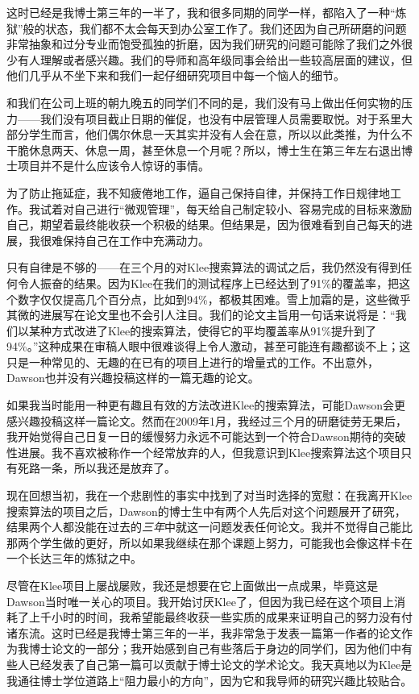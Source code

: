 \documentclass[letter,12pt]{book}
\begin{document}
\begin{CJK}{UTF8}{gbsn}
这时已经是我博士第三年的一半了，我和很多同期的同学一样，都陷入了一种“炼狱”般的状态，我们都不太会每天到办公室工作了。我们还因为自己所研磨的问题非常抽象和过分专业而饱受孤独的折磨，因为我们研究的问题可能除了我们之外很少有人理解或者感兴趣。我们的导师和高年级同事会给出一些较高层面的建议，但他们几乎从不坐下来和我们一起仔细研究项目中每一个恼人的细节。

和我们在公司上班的朝九晚五的同学们不同的是，我们没有马上做出任何实物的压力——我们没有项目截止日期的催促，也没有中层管理人员需要取悦。对于系里大部分学生而言，他们偶尔休息一天其实并没有人会在意，所以以此类推，为什么不干脆休息两天、休息一周，甚至休息一个月呢？所以，博士生在第三年左右退出博士项目并不是什么应该令人惊讶的事情。

为了防止拖延症，我不知疲倦地工作，逼自己保持自律，并保持工作日规律地工作。我试着对自己进行“微观管理”，每天给自己制定较小、容易完成的目标来激励自己，期望着最终能收获一个积极的结果。但结果是，因为很难看到自己每天的进展，我很难保持自己在工作中充满动力。

只有自律是不够的——在三个月的对Klee搜索算法的调试之后，我仍然没有得到任何令人振奋的结果。因为Klee在我们的测试程序上已经达到了91\%的覆盖率，把这个数字仅仅提高几个百分点，比如到94\%，都极其困难。雪上加霜的是，这些微乎其微的进展写在论文里也不会引人注目。我们的论文主旨用一句话来说将是：“我们以某种方式改进了Klee的搜索算法，使得它的平均覆盖率从91\%提升到了94\%。”这种成果在审稿人眼中很难谈得上令人激动，甚至可能连有趣都谈不上；这只是一种常见的、无趣的在已有的项目上进行的增量式的工作。不出意外，Dawson也并没有兴趣投稿这样的一篇无趣的论文。

如果我当时能用一种更有趣且有效的方法改进Klee的搜索算法，可能Dawson会更感兴趣投稿这样一篇论文。然而在2009年1月，我经过三个月的研磨徒劳无果后，我开始觉得自己日复一日的缓慢努力永远不可能达到一个符合Dawson期待的突破性进展。我不喜欢被称作一个经常放弃的人，但我意识到Klee搜索算法这个项目只有死路一条，所以我还是放弃了。

现在回想当初，我在一个悲剧性的事实中找到了对当时选择的宽慰：在我离开Klee搜索算法的项目之后，Dawson的博士生中有两个人先后对这个问题展开了研究，结果两个人都没能在过去的\emph{三年}中就这一问题发表任何论文。我并不觉得自己能比那两个学生做的更好，所以如果我继续在那个课题上努力，可能我也会像这样卡在一个长达三年的炼狱之中。

\breakline

尽管在Klee项目上屡战屡败，我还是想要在它上面做出一点成果，毕竟这是Dawson当时唯一关心的项目。我开始讨厌Klee了，但因为我已经在这个项目上消耗了上千小时的时间，我希望能最终收获一些实质的成果来证明自己的努力没有付诸东流。这时已经是我博士第三年的一半，我非常急于发表一篇第一作者的论文作为我博士论文的一部分；我开始感到自己有些落后于身边的同学们，因为他们中有些人已经发表了自己第一篇可以贡献于博士论文的学术论文。我天真地以为Klee是我通往博士学位道路上“阻力最小的方向”，因为它和我导师的研究兴趣比较贴合。


\end{CJK}
\end{document}
